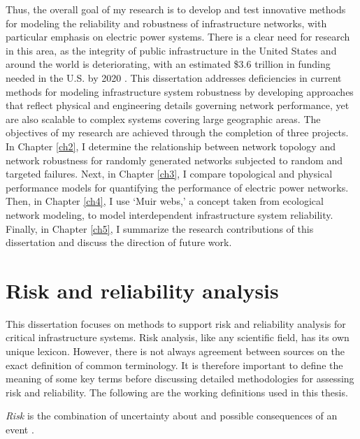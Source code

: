 Thus, the overall goal of my research is to develop and test innovative methods for modeling the reliability and robustness of infrastructure networks, with particular emphasis on electric power systems. There is a clear need for research in this area, as the integrity of public infrastructure in the United States and around the world is deteriorating, with an estimated \$3.6 trillion in funding needed in the U.S. by 2020 \cite{ASCE2013}. This dissertation addresses deficiencies in current methods for modeling infrastructure system robustness by developing approaches that reflect physical and engineering details governing network performance, yet are also scalable to complex systems covering large geographic areas. The objectives of my research are achieved through the completion of three projects. In Chapter \ref{ch2}, I determine the relationship between network topology and network robustness for randomly generated networks subjected to random and targeted failures. Next, in Chapter \ref{ch3}, I compare topological and physical performance models for quantifying the performance of electric power networks. Then, in Chapter \ref{ch4}, I use `Muir webs,' a concept taken from ecological network modeling, to model interdependent infrastructure system reliability. Finally, in Chapter \ref{ch5}, I summarize the research contributions of this dissertation and discuss the direction of future work.


\section{Risk and reliability analysis}
\label{sec:ch1:riskreliability}

This dissertation focuses on methods to support risk and reliability analysis for critical infrastructure systems. Risk analysis, like any scientific field, has its own unique lexicon. However, there is not always agreement between sources on the exact definition of common terminology. It is therefore important to define the meaning of some key terms before discussing detailed methodologies for assessing risk and reliability.  The following are the working definitions used in this thesis.

\begin{defn}
\emph{Risk} is the combination of uncertainty about and possible consequences of an event \cite{Aven2007, Aven2008}.
\end{defn}

